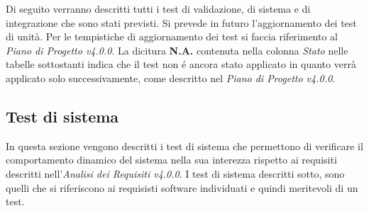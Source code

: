 Di seguito verranno descritti tutti i test di validazione, di sistema e di integrazione che sono stati previsti. Si prevede in futuro l'aggiornamento dei test di unità. Per le tempistiche di aggiornamento dei test si faccia riferimento al \textit{Piano di Progetto v4.0.0}. La dicitura \textbf{N.A.} contenuta nella colonna \textit{Stato} nelle tabelle sottostanti indica che il test non é ancora stato applicato in quanto verrà applicato solo successivamente, come descritto nel \textit{Piano di Progetto v4.0.0}.


\subsection{Test di sistema}
In questa sezione vengono descritti i test di sistema che permettono di verificare il comportamento dinamico del sistema nella sua interezza rispetto ai requisiti descritti nell'\textit{Analisi dei Requisiti v4.0.0}.
I test di sistema descritti sotto, sono quelli che si riferiscono ai requisisti software individuati e quindi meritevoli di un test.

